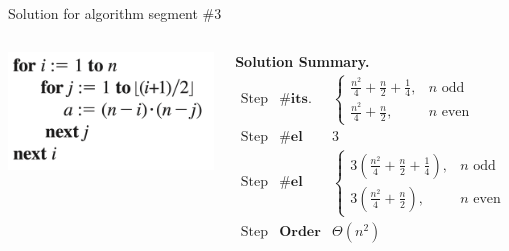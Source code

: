 \documentclass[10pt]{beamer}
\begin{document}
\begin{frame}{Solution for algorithm segment \#3}
\footnotesize 

\setlength{\columnsep}{0pt} %

\begin{columns}[c]
    \includegraphics[width=\linewidth]{images/epp_hw_17}
	
    \colorbox{green!30}{\textbf{Solution Summary.}} \\[0.3em]
    \[
    \begin{array}{lll}
    \text{Step 1} & \textbf{\# its.} & \begin{cases}
    \frac{n^2}{4} + \frac{n}{2} + \frac{1}{4}, & \text{$n$ odd} \\
    \frac{n^2}{4} + \frac{n}{2}, & \text{$n$ even}
    \end{cases} \\
    \text{Step 2} & \textbf{\# el ops. per it.} & 3 \\
    \text{Step 3} & \textbf{\# el ops.} & \begin{cases}
    3\left(\frac{n^2}{4} + \frac{n}{2} + \frac{1}{4}\right), & \text{$n$ odd} \\
    3\left(\frac{n^2}{4} + \frac{n}{2}\right), & \text{$n$ even}
    \end{cases} \\
    \text{Step 4} & \textbf{Order} & \Theta(n^2)
    \end{array}
    \]
\end{columns}



\end{frame}
\end{document}
